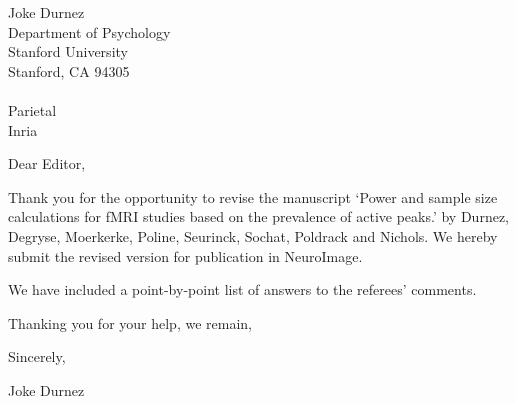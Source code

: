 \documentclass{letter}
\begin{document}
\begin{letter}{Joke Durnez\\
Department of Psychology\\
Stanford University\\
Stanford, CA 94305 \\
\\
Parietal\\
Inria  }


\opening{Dear Editor,}

Thank you for the opportunity to revise the manuscript `Power and sample size calculations for fMRI studies based on the prevalence of active peaks.' by Durnez, Degryse, Moerkerke, Poline, Seurinck, Sochat, Poldrack and Nichols.  We hereby submit the revised version for publication in NeuroImage.

We have included a point-by-point list of answers to the referees' comments.

Thanking you for your help, we remain,


\closing{Sincerely,}

Joke Durnez
\end{letter}
\end{document}
